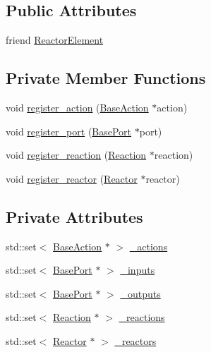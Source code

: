 \subsection*{Public Attributes}
\begin{DoxyCompactItemize}
\item 
friend \hyperlink{classreactor_1_1Reactor_abd595c37f2e89b0bd53db2c0f18b1ad7}{Reactor\+Element}
\end{DoxyCompactItemize}
\subsection*{Private Member Functions}
\begin{DoxyCompactItemize}
\item 
void \hyperlink{classreactor_1_1Reactor_af03410009a1cac736179774282212219}{register\+\_\+action} (\hyperlink{classreactor_1_1BaseAction}{Base\+Action} $\ast$action)
\item 
void \hyperlink{classreactor_1_1Reactor_a026ca6574effbb38c4769c10efaef06d}{register\+\_\+port} (\hyperlink{classreactor_1_1BasePort}{Base\+Port} $\ast$port)
\item 
void \hyperlink{classreactor_1_1Reactor_a728acca5f61851ae9252df17e4b5e0ad}{register\+\_\+reaction} (\hyperlink{classreactor_1_1Reaction}{Reaction} $\ast$reaction)
\item 
void \hyperlink{classreactor_1_1Reactor_a120b7977b590c87b94066ff87c233650}{register\+\_\+reactor} (\hyperlink{classreactor_1_1Reactor}{Reactor} $\ast$reactor)
\end{DoxyCompactItemize}
\subsection*{Private Attributes}
\begin{DoxyCompactItemize}
\item 
std\+::set$<$ \hyperlink{classreactor_1_1BaseAction}{Base\+Action} $\ast$ $>$ \hyperlink{classreactor_1_1Reactor_a08956f27d0316095058663a1e234854c}{\+\_\+actions}
\item 
std\+::set$<$ \hyperlink{classreactor_1_1BasePort}{Base\+Port} $\ast$ $>$ \hyperlink{classreactor_1_1Reactor_a58b3ea8a7be4ff65de173fc8df01c8b1}{\+\_\+inputs}
\item 
std\+::set$<$ \hyperlink{classreactor_1_1BasePort}{Base\+Port} $\ast$ $>$ \hyperlink{classreactor_1_1Reactor_a925d1c0f776a963e9aac01084bdaedc2}{\+\_\+outputs}
\item 
std\+::set$<$ \hyperlink{classreactor_1_1Reaction}{Reaction} $\ast$ $>$ \hyperlink{classreactor_1_1Reactor_a894dedef16b5d6e927eecc223b0748ba}{\+\_\+reactions}
\item 
std\+::set$<$ \hyperlink{classreactor_1_1Reactor}{Reactor} $\ast$ $>$ \hyperlink{classreactor_1_1Reactor_aac609122effff608df6b5f3e5a1dc05b}{\+\_\+reactors}
\end{DoxyCompactItemize}
